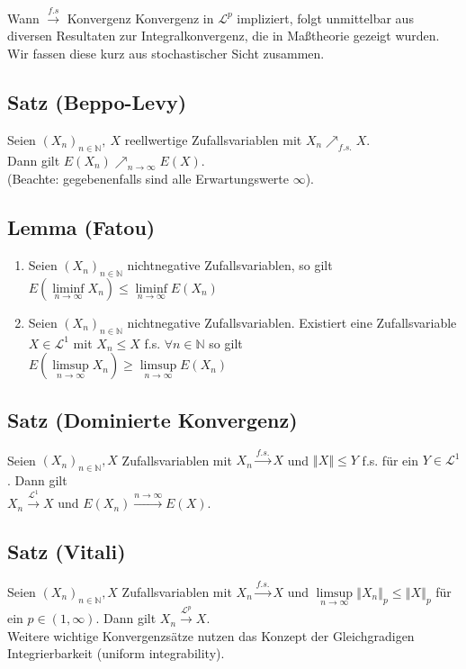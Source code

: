 \documentclass[german,10pt,oneside, fleqn, a4paper]{article}
\newcommand {\N}	{\mathbb{N}}
\newcommand{\lsup}[1][n]{\limsup\limits_{#1\rightarrow\infty}}
\newcommand{\linf}[1][n]{\liminf\limits_{#1\rightarrow\infty}}
\newcommand{\brc}[1]{\left(#1\right)}
\newcommand{\folge}[3][\N]{\left(#2_#3\right)_{#3\in #1}}
\newcommand{\norm}[1]{\left\Vert #1 \right\Vert}
\newcommand{\mc}[1]{\mathcal{#1}}
\newcommand{\1}[1]{1_{#1}}
\newcommand{\2}[1]{\1{\brac{#1}}}
\begin{document}
Wann $\xrightarrow{f.s}$ Konvergenz Konvergenz in $\mathcal{L}^p$ impliziert, folgt unmittelbar aus diversen Resultaten zur Integralkonvergenz, die in Maßtheorie gezeigt wurden. Wir fassen diese kurz aus stochastischer Sicht zusammen.
\subsection{Satz (Beppo-Levy)}
Seien $(X_n)_{n\in\N},\ X$ reellwertige Zufallsvariablen mit $X_n\nearrow_{f.s.}X$.\\ 
Dann gilt $E(X_n)\nearrow_{n\rightarrow\infty}E(X)$. \\(Beachte: gegebenenfalls sind alle Erwartungswerte $\infty$).




\subsection{Lemma (Fatou)}
\begin{enumerate}[label=(\alph*)]
\item Seien $\folge{X}{n}$ nichtnegative Zufallsvariablen, so gilt\\
$E\brc{\linf X_n}\leq\linf{E(X_n)}$
\item Seien $\folge{X}{n}$ nichtnegative Zufallsvariablen. Existiert eine Zufallsvariable  $X\in \mc{L}^1$ mit $X_n\leq X$ f.s. $\forall n\in\N$ so gilt \\
$E\brc{\lsup X_n}\geq\lsup{E\brc{X_n}}$
\end{enumerate}

\subsection{Satz (Dominierte Konvergenz)}
Seien $\folge{X}{n},X$ Zufallsvariablen mit $X_n\xrightarrow{f.s.}X$ und $\norm{X}\leq Y$ f.s. für ein $Y\in \mc{L}^1$. Dann gilt\\
$X_n\xrightarrow{\mathcal{L}^1}X$ und $E(X_n)\xrightarrow{n\rightarrow\infty}E(X)$.

\subsection{Satz (Vitali)}
Seien $\folge{X}{n},X$ Zufallsvariablen mit $X_n\xrightarrow{f.s.}X$ und $\lsup\norm{X_n}_p\leq\norm{X}_p$ für ein $p\in(1,\infty)$. Dann gilt $X_n\xrightarrow{\mathcal{L}^p}X$.\\
Weitere wichtige Konvergenzsätze nutzen das Konzept der Gleichgradigen Integrierbarkeit (uniform integrability).
\end{document}
